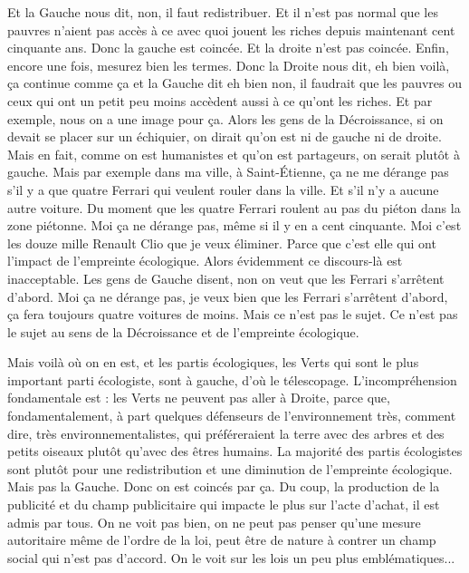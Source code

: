 \begin{description}
Et la Gauche nous dit, non, il faut redistribuer. Et il n'est pas normal que les pauvres n'aient pas accès à ce avec quoi jouent les riches depuis maintenant cent cinquante ans. Donc la gauche est coincée. Et la droite n'est pas coincée. Enfin, encore une fois, mesurez bien les termes. Donc la Droite nous dit, eh bien voilà, ça continue comme ça et la Gauche dit eh bien non, il faudrait que les pauvres ou ceux qui ont un petit peu moins accèdent aussi à ce qu'ont les riches. Et par exemple, nous on a une image pour ça. 
Alors les gens de la Décroissance, si on devait se placer sur un échiquier, on dirait qu'on est ni de gauche ni de droite. Mais en fait, comme on est humanistes et qu'on est partageurs, on serait plutôt à gauche. Mais par exemple dans ma ville, à Saint-Étienne, ça ne me dérange pas s’il y a que quatre Ferrari qui veulent rouler dans la ville. Et s’il n'y a aucune autre voiture. Du moment que les quatre Ferrari roulent au pas du piéton dans la zone piétonne. Moi ça ne dérange pas, même si il y en a cent cinquante. Moi c'est les douze mille Renault Clio que je veux éliminer. Parce que c'est elle qui ont l'impact de l'empreinte écologique. Alors évidemment ce discours-là est inacceptable. Les gens de Gauche disent, non on veut que les Ferrari s'arrêtent d'abord. Moi ça ne dérange pas, je veux bien que les Ferrari s'arrêtent d'abord, ça fera toujours quatre voitures de moins. Mais ce n'est pas le sujet. Ce n'est pas le sujet au sens de la Décroissance et de l'empreinte écologique.

Mais voilà où on en est, et les partis écologiques, les Verts qui sont  le plus important parti écologiste, sont à gauche, d'où le télescopage. L’incompréhension fondamentale est : les Verts ne peuvent pas aller à Droite, parce que, fondamentalement, à part quelques défenseurs de l'environnement très, comment dire, très environnementalistes, qui préféreraient la terre avec des arbres et des petits oiseaux plutôt qu'avec des êtres humains. La majorité des partis écologistes sont plutôt pour une redistribution et une diminution de l'empreinte écologique. Mais pas la Gauche. Donc on est coincés par ça. Du coup, la production de la publicité et du champ publicitaire qui impacte le plus sur l'acte d'achat, il est admis par tous. On ne voit pas bien, on ne peut pas penser qu'une mesure autoritaire même de l'ordre de la loi, peut être de nature à contrer un champ social qui n'est pas d'accord. On le voit sur les lois un peu plus emblématiques...

\vspace{1\baselineskip}


\end{description}
